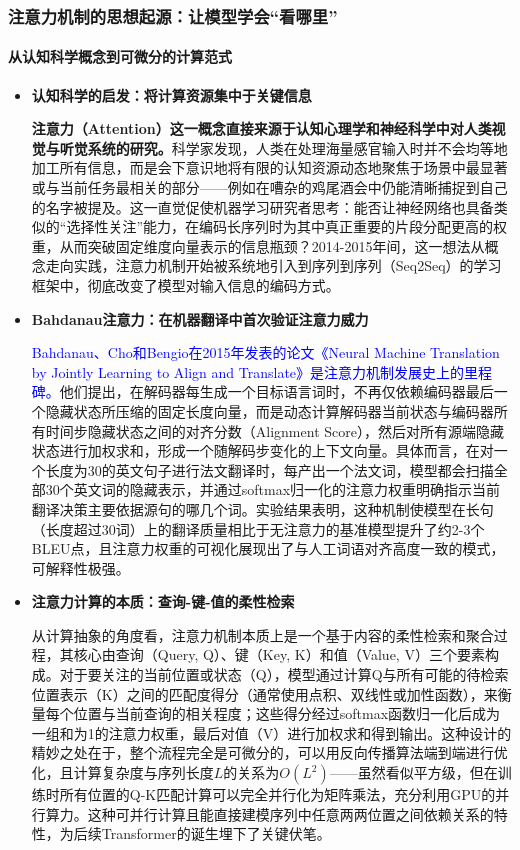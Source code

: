 \documentclass[11pt]{beamer}
\begin{document}
\begin{frame}
\frametitle{注意力机制的思想起源：让模型学会“看哪里”}
\framesubtitle{从认知科学概念到可微分的计算范式}

\begin{itemize}
    \item \textbf{认知科学的启发：将计算资源集中于关键信息}
    
    \textbf{注意力（Attention）这一概念直接来源于认知心理学和神经科学中对人类视觉与听觉系统的研究。}科学家发现，人类在处理海量感官输入时并不会均等地加工所有信息，而是会下意识地将有限的认知资源动态地聚焦于场景中最显著或与当前任务最相关的部分——例如在嘈杂的鸡尾酒会中仍能清晰捕捉到自己的名字被提及。这一直觉促使机器学习研究者思考：能否让神经网络也具备类似的“选择性关注”能力，在编码长序列时为其中真正重要的片段分配更高的权重，从而突破固定维度向量表示的信息瓶颈？2014-2015年间，这一想法从概念走向实践，注意力机制开始被系统地引入到序列到序列（Seq2Seq）的学习框架中，彻底改变了模型对输入信息的编码方式。

    \item \textbf{Bahdanau注意力：在机器翻译中首次验证注意力威力}
    
    \textcolor{blue}{Bahdanau、Cho和Bengio在2015年发表的论文《Neural Machine Translation by Jointly Learning to Align and Translate》是注意力机制发展史上的里程碑。}他们提出，在解码器每生成一个目标语言词时，不再仅依赖编码器最后一个隐藏状态所压缩的固定长度向量，而是动态计算解码器当前状态与编码器所有时间步隐藏状态之间的对齐分数（Alignment Score），然后对所有源端隐藏状态进行加权求和，形成一个随解码步变化的上下文向量。具体而言，在对一个长度为30的英文句子进行法文翻译时，每产出一个法文词，模型都会扫描全部30个英文词的隐藏表示，并通过softmax归一化的注意力权重明确指示当前翻译决策主要依据源句的哪几个词。实验结果表明，这种机制使模型在长句（长度超过30词）上的翻译质量相比于无注意力的基准模型提升了约2-3个BLEU点，且注意力权重的可视化展现出了与人工词语对齐高度一致的模式，可解释性极强。

    \item \textbf{注意力计算的本质：查询-键-值的柔性检索}
    
    \alert{从计算抽象的角度看，注意力机制本质上是一个基于内容的柔性检索和聚合过程}，其核心由查询（Query, Q）、键（Key, K）和值（Value, V）三个要素构成。对于要关注的当前位置或状态（Q），模型通过计算Q与所有可能的待检索位置表示（K）之间的匹配度得分（通常使用点积、双线性或加性函数），来衡量每个位置与当前查询的相关程度；这些得分经过softmax函数归一化后成为一组和为1的注意力权重，最后对值（V）进行加权求和得到输出。这种设计的精妙之处在于，整个流程完全是可微分的，可以用反向传播算法端到端进行优化，且计算复杂度与序列长度$L$的关系为$O(L^2)$——虽然看似平方级，但在训练时所有位置的Q-K匹配计算可以完全并行化为矩阵乘法，充分利用GPU的并行算力。这种可并行计算且能直接建模序列中任意两两位置之间依赖关系的特性，为后续Transformer的诞生埋下了关键伏笔。
\end{itemize}
\end{frame}
\end{document}
